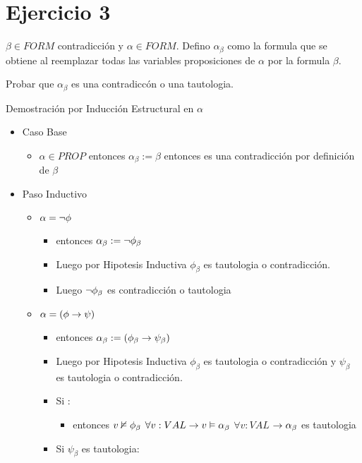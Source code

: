\documentclass[14pt,a4paper,fleqn]{article}
\begin{document}
\section*{Ejercicio 3}

$\beta \in FORM$ contradicción y $\alpha \in FORM$. Defino $\alpha_{\beta}$ como la formula que se obtiene al reemplazar todas las variables proposiciones de $\alpha$ por la formula $\beta$.

Probar que $\alpha_{\beta}$ es una contradiccón o una tautologia.

Demostración por Inducción Estructural en $\alpha$ 

\begin{itemize}
	\item Caso Base
	\begin{itemize}
		\item $\alpha \in PROP$ entonces $\alpha_{\beta} := \beta$ entonces es una contradicción por definición de $\beta$
	\end{itemize}
	\item Paso Inductivo
	\begin{itemize}
		\item $\alpha = \neg \phi$ 
		\begin{itemize}
			\item entonces $\alpha_{\beta} := \neg \phi_{\beta}$ 
			\item Luego por Hipotesis Inductiva $\phi_{\beta}$ es tautologia o contradicción. 
			\item Luego $\neg \phi_{\beta}$ es contradicción o tautologia
		\end{itemize}
		\item $\alpha = (\phi \rightarrow \psi)$
		\begin{itemize}
			\item entonces $\alpha_{\beta} := (\phi_{\beta} \rightarrow \psi_{\beta})$ 
			\item Luego por Hipotesis Inductiva $\phi_{\beta}$ es tautologia o contradicción y $\psi_{\beta}$ es tautologia o contradicción. 
			\item Si :
			\begin{itemize}
				 \item entonces $v \nvDash \phi_{\beta}$ $\forall v: VAL \rightarrow v \vDash \alpha_{\beta}$ $\forall v:VAL$ $ \rightarrow  \alpha_{\beta}$ es tautologia 
			\end{itemize}
			\item Si $\psi_{\beta}$ es tautologia:
			\begin{itemize}

\end{itemize}
\end{itemize}
\end{itemize}
\end{itemize}
\end{document}
